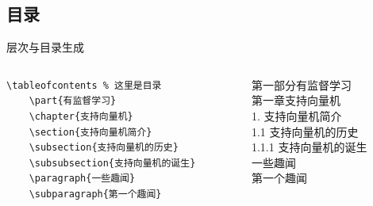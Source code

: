     \subsection{目录}
    \begin{frame}[fragile]{层次与目录生成}
    \begin{columns}
    \begin{column}{.6\textwidth}
    \lstset{language=[LaTeX]TeX}
    \begin{lstlisting}[basicstyle=\ttfamily\small]
    \tableofcontents % 这里是目录
    \part{有监督学习}
    \chapter{支持向量机}
    \section{支持向量机简介}
    \subsection{支持向量机的历史}
    \subsubsection{支持向量机的诞生}
    \paragraph{一些趣闻}
    \subparagraph{第一个趣闻}
    \end{lstlisting}
    \end{column}
    \begin{column}{.4\textwidth}
    第一部分\quad 有监督学习\\
    第一章\quad 支持向量机 \\
    1. 支持向量机简介 \\
    1.1 支持向量机的历史 \\
    1.1.1 支持向量机的诞生 \\
    一些趣闻  \\
    第一个趣闻
    \end{column}
    \end{columns}
    
    \end{frame}


